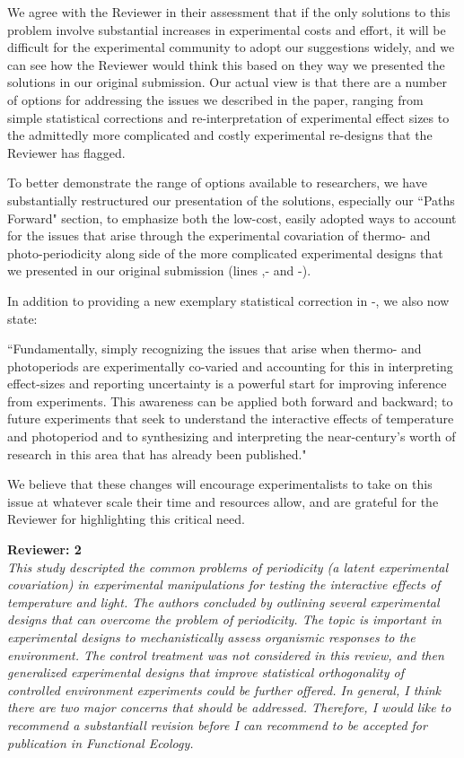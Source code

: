 \documentclass[11pt]{article}
\begin{document}
 We agree with the Reviewer in their assessment that if the only solutions to this problem involve substantial increases in experimental costs and effort, it will be difficult for the experimental community to adopt our suggestions widely, and we can see how the Reviewer would think this based on they way we presented the solutions in our original submission. Our actual view is that there are a number of options for addressing the issues we described in the paper, ranging from simple statistical corrections and re-interpretation of experimental effect sizes to the admittedly more complicated and costly experimental re-designs that the Reviewer has flagged.
 
To better demonstrate the range of options available to researchers, we have substantially restructured our presentation of the solutions, especially our ``Paths Forward" section, to emphasize both the low-cost, easily adopted ways to account for the issues that arise through the experimental covariation of thermo- and photo-periodicity along side of the more complicated experimental designs that we presented in our original submission (lines ,- and -). 

In addition to providing a new exemplary statistical correction in -, we also now state:

``Fundamentally, simply recognizing the issues that arise when thermo- and photoperiods are experimentally co-varied and accounting for this in interpreting effect-sizes and reporting uncertainty is a powerful start for improving inference from experiments. This awareness can be applied both forward and backward; to future experiments that seek to understand the interactive effects of temperature and photoperiod and to synthesizing and interpreting the near-century's worth of research in this area that has already been published."

We believe that these changes will encourage experimentalists to take on this issue at whatever scale their time and resources allow, and are grateful for the Reviewer for highlighting this critical need.

\textbf{Reviewer: 2}\\
\emph{This study descripted the common problems of periodicity (a latent experimental covariation) in experimental manipulations for testing the interactive effects of temperature and light. The authors concluded by outlining several experimental designs that can overcome the problem of periodicity. The topic is important in experimental designs to mechanistically assess organismic responses to the environment. The control treatment was not considered in this review, and then generalized experimental designs that improve statistical orthogonality of controlled environment experiments could be further offered. In general, I think there are two major concerns that should be addressed. Therefore, I would like to recommend a substantiall revision before I can recommend to be accepted for publication in Functional Ecology.}
\end{document}

